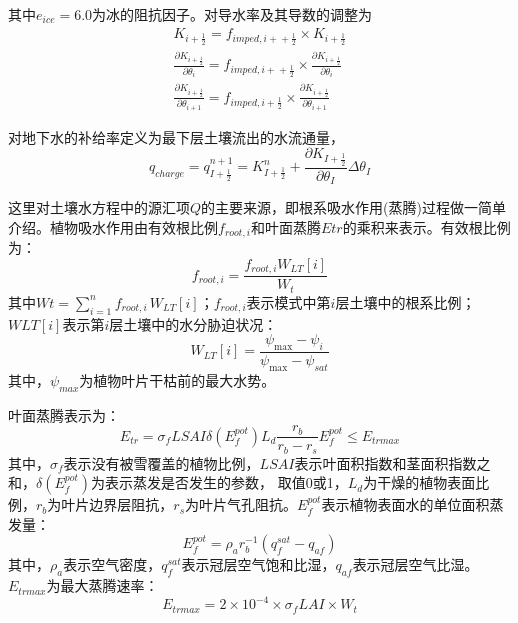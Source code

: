 其中$e_{ice}=6.0$为冰的阻抗因子。对导水率及其导数的调整为
\begin{equation}
\begin{array}{c}K_{i+\frac{1}{2}}={f}_{ {imped,i+ }+\frac{1}{2}} \times K_{i+\frac{1}{2}} \\ \frac{\partial K_{i+\frac{1}{2}}}{\partial \theta_{i}}
    ={f}_{ {imped,i+ }+\frac{1}{2}} \times \frac{\partial K_{i+\frac{1}{2}}}{\partial \theta_{i}} \\ \frac{\partial K_{i+\frac{1}{2}}}{\partial \theta_{i+1}}=
    {f}_{ {imped,i+ } \frac{1}{2}} \times \frac{\partial K_{i+\frac{1}{2}}}{\partial \theta_{i+1}}\end{array}
\end{equation}


对地下水的补给率定义为最下层土壤流出的水流通量，
\begin{equation}
{q}_{ {charge }}=q_{I+\frac{1}{2}}^{n+1}=K_{I+\frac{1}{2}}^{n}+\frac{\partial K_{I+\frac{1}{2}}}{\partial \theta_{I}} \Delta \theta_{I}
\end{equation}


这里对土壤水方程中的源汇项$Q$的主要来源，即根系吸水作用(蒸腾)过程做一简单介绍。植物吸水作用由有效根比例$f_{root,i}$和叶面蒸腾$Etr$的乘积来表示\citep{dai2003common}。有效根比例为：
\begin{equation}
{f}_{ {root }, {i}}=\frac{{f}_{{root}, {i}} {W}_{{LT}}[{i}]}{W_{t}}
\end{equation}
其中$Wt = \sum_{i=1}^{n}{f_{root,i\ }W_{LT}\left[i\right]}$；$f_{root,i}$表示模式中第$i$层土壤中的根系比例；$WLT[i]$表示第$i$层土壤中的水分胁迫状况：
\begin{equation}
{W}_{{LT}}[{i}]=\frac{\psi_{\max }-\psi_{i}}{\psi_{\max }-\psi_{sat}}
\end{equation}
其中，$\psi_{max}$为植物叶片干枯前的最大水势。


叶面蒸腾表示为：
\begin{equation}
{E}_{{tr}}=\sigma_{{f}} LSAI \delta\left({E}_{{f}}^{{pot}}\right) {L}_{{d}} \frac{{r}_{{b}}}{{r}_{{b}}-{r}_{{s}}} {E}_{{f}}^{{pot}} \leq {E}_{{trmax}}
\end{equation}
其中，$\sigma_f$表示没有被雪覆盖的植物比例，$LSAI$表示叶面积指数和茎面积指数之和，$\delta\left(E_f^{pot}\right)$为表示蒸发是否发生的参数，
取值0或1，$L_d$为干燥的植物表面比例，$r_b$为叶片边界层阻抗，$r_s$为叶片气孔阻抗。$E_f^{pot}$表示植物表面水的单位面积蒸发量：
\begin{equation}
{E}_{{f}}^{{pot}}=\rho_{{a}} {r}_{{b}}^{-1}\left({q}_{{f}}^{{sat}}-{q}_{{af}}\right)
\end{equation}
其中，$\rho_a$表示空气密度，$q_f^{sat}$表示冠层空气饱和比湿，$q_{af}$表示冠层空气比湿。$E_{trmax}$为最大蒸腾速率：
\begin{equation}
{E}_{ {trmax }}=2 \times 10^{-4} \times \sigma_{{f}} L A I \times W_{t}
\end{equation}
